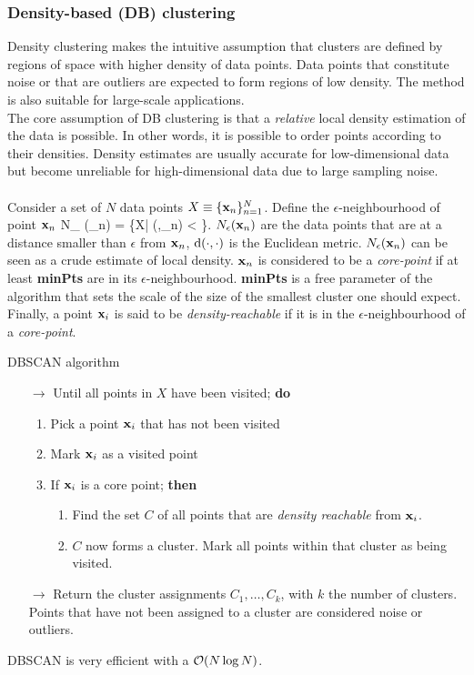 \subsubsection{Density-based (DB) clustering}
\label{subsubsec:clusterPracticalDBSCAN}
Density clustering makes the intuitive assumption that clusters are defined by regions of space with higher density of data points. Data points that constitute noise or that are outliers are expected to form regions of low density. The method is also suitable for large-scale applications.\\
The core assumption of DB clustering is that a \emph{relative} local density estimation of the data is possible. In other words, it is possible to order points according to their densities. Density estimates are usually accurate for low-dimensional data but become unreliable for high-dimensional data due to large sampling noise.\\
\\
	Consider a set of $N$ data points $X\equiv \{\mathbf{x}_n\}^N_{n=1}$. Define the $\epsilon$-neighbourhood of point $\mathbf{x}_n$ 
\be 
N_{\epsilon} (\mx_n) = \{\mx \in X| \md(\mx,\mx_n) < \epsilon \}.
\ee 
$N_{\epsilon}(\mathbf{x}_n)$ are the data points that are at a distance smaller than $\epsilon$ from $\mathbf{x}_n$, $\mathrm{d}(\cdot,\cdot)$ is the Euclidean metric. $N_{\epsilon}(\mathbf{x}_n)$ can be seen as a crude estimate of local density. $\mathbf{x}_n$ is considered to be a \emph{core-point} if at least \textbf{minPts} are in its $\epsilon$-neighbourhood. \textbf{minPts} is a free parameter of the algorithm that sets the scale of the size of the smallest cluster one should expect. Finally, a point $\mathbf{x}_i$ is said to be \emph{density-reachable} if it is in the $\epsilon$-neighbourhood of a \emph{core-point}.
\begin{mybox}{DBSCAN algorithm}
\begin{enumerate}
	\item[$\rightarrow$] Until all points in $X$ have been visited; \textbf{do}
	\begin{enumerate}
		\item Pick a point $\mathbf{x}_i$ that has not been visited
		\item Mark $\mathbf{x}_i$ as a visited point
		\item If $\mathbf{x}_i$ is a core point; \textbf{then}
		\begin{enumerate}
			\item Find the set $C$ of all points that are \emph{density reachable} from $\mathbf{x}_i$.
			\item $C$ now forms a cluster. Mark all points within that cluster as being visited.
		\end{enumerate}
	\end{enumerate}
	\item[$\rightarrow$] Return the cluster assignments $C_1,\dots,C_k$, with $k$ the number of clusters. Points that have not been assigned to a cluster are considered noise or outliers.
\end{enumerate}
\end{mybox}
DBSCAN is very efficient with a $\mathcal{O}(N\log N)$.

